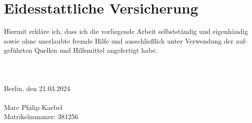 
\chapter*{Eidesstattliche Versicherung}


\begin{otherlanguage}{ngerman}
Hiermit erkläre ich, dass ich die vorliegende Arbeit selbstständig und eigenhändig sowie ohne unerlaubte
fremde Hilfe und ausschließlich unter Verwendung der aufgeführten Quellen und Hilfsmittel angefertigt habe. \\
\hphantom{t} \\
\hphantom{t} \\
\hphantom{t} \\
Berlin, den 21.03.2024 \\  %
\\
\hphantom{hallo} \hfill Marc Philip Kaebel \\
\hphantom{hallo} \hfill {\small Matrikelnummer: 381256}
\end{otherlanguage}

